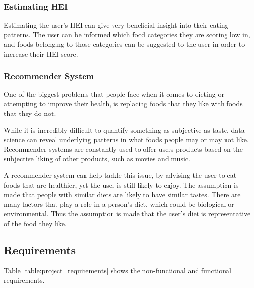 \documentclass{article}
\begin{document}
\subsubsection{Estimating HEI}
Estimating the user's HEI can give very beneficial insight into their eating patterns. The user can be informed which food categories they are scoring low in, and foods belonging to those categories can be suggested to the user in order to increase their HEI score. 

\subsubsection{Recommender System}
One of the biggest problems that people face when it comes to dieting or attempting to improve their health, is replacing foods that they like with foods that they do not. 

\bigskip
\noindent While it is incredibly difficult to quantify something as subjective as taste, data science can reveal underlying patterns in what foods people may or may not like. Recommender systems are constantly used to offer users products based on the subjective liking of other products, such as movies and music. 

\bigskip
\noindent A recommender system can help tackle this issue, by advising the user to eat foods that are healthier, yet the user is still likely to enjoy. The assumption is made that people with similar diets are likely to have similar tastes. There are many factors that play a role in a person's diet, which could be biological or environmental. Thus the assumption is made that the user's diet is representative of the food they like.

\subsection{Requirements}
Table \ref{table:project_requirements} shows the non-functional and functional requirements.
\end{document}

